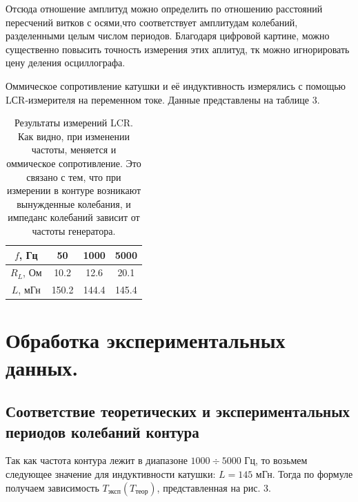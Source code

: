 \documentclass[a4paper, 14pt]{extarticle}%
\newcommand\ECaption[1]{%
     \captionsetup{font=footnotesize}%
     \caption{#1}}
\begin{document}
 Отсюда отношение амплитуд можно определить по отношению расстояний пересчений витков с осями,что соответствует амплитудам колебаний, разделенными целым числом периодов. Благодаря цифровой картине, можно существенно повысить точность измерения этих аплитуд, тк можно игнорировать цену деления осциллографа. 

Оммическое сопротивление катушки и её индуктивность измерялись с помощью LСR-измерителя на переменном токе. Данные представлены на таблице 3.

\begin{table}[h!]
\begin{center}
\begin{tabular}{|c|c|c|c|}
\hline
\rowcolor[HTML]{9698ED} 
$f$, Гц     & 50    & 1000  & 5000  \\ \hline
$R_{L}$, Ом & 10.2  & 12.6  & 20.1  \\ \hline
\rowcolor[HTML]{9698ED} 
$L$, мГн     & 150.2 & 144.4 & 145.4 \\ \hline
\end{tabular}
\ECaption{Результаты измерений LCR. Как видно, при изменении частоты, меняется и оммическое сопротивление. Это связано с тем, что при измерении в контуре возникают вынужденные колебания, и импеданс колебаний зависит от частоты генератора.}
\end{center}
\end{table}

\section*{Обработка экспериментальных данных.}

\subsection*{Соответствие теоретических и экспериментальных периодов колебаний контура}

Так как частота контура лежит в диапазоне $1000\div5000$ Гц, то возьмем следующее значение для индуктивности катушки: $L = 145$ мГн. Тогда по формуле получаем зависимость $T_{\text{эксп}}(T_{\text{теор}})$, представленная на рис. 3.
\end{document}
